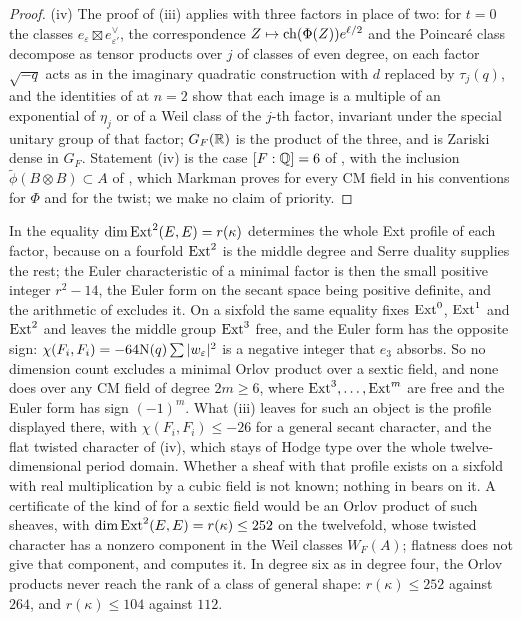 \begin{proof}
(iv) The proof of (iii) applies with three
factors in place of two: for $t=0$ the classes $e_{\varepsilon}\boxtimes
e_{\varepsilon'}^{\vee}$, the correspondence $Z\mapsto\operatorname{ch}(\Phi(Z))e^{\ell/2}$
and the Poincar\'e class decompose as tensor products over $j$ of classes of
even degree, on each factor $\sqrt{-q}$ acts as in the imaginary quadratic
construction with $d$ replaced by $\tau_{j}(q)$, and the identities of
 at $n=2$ show that each image is a multiple of an
exponential of $\eta_{j}$ or of a Weil class of the $j$-th factor, invariant
under the special unitary group of that factor; $G_{F}(\mathbb{R})$ is the product of
the three, and is Zariski dense in $G_{F}$. Statement (iv) is the case
$[F:\mathbb{Q}]=6$ of \cite[Proposition~10.2.1(1)]{Mar25c}, with the inclusion
$\widetilde\phi(B\otimes B)\subset A$ of \cite[p.~33]{Mar25c}, which Markman
proves for every CM field in his conventions for $\Phi$ and for the twist; we
make no claim of priority.
\end{proof}

\begin{remark}
\label{rem:sexticparity}
In  the equality $\dim\operatorname{Ext}^{2}(E,E)=r(\kappa)$
determines the whole Ext profile of each factor, because on a fourfold
$\operatorname{Ext}^{2}$ is the middle degree and Serre duality supplies the rest; the Euler
characteristic of a minimal factor is then the small positive integer
$r^{2}-14$, the Euler form on the secant space being positive definite, and
the arithmetic of  excludes it. On a sixfold the same
equality fixes $\operatorname{Ext}^{0}$, $\operatorname{Ext}^{1}$ and $\operatorname{Ext}^{2}$ and leaves the middle
group $\operatorname{Ext}^{3}$ free, and the Euler form has the opposite sign:
$\chi(F_{i},F_{i})=-64\mathrm{N}(q)\sum|w_{\varepsilon}|^{2}$ is a negative integer
that $e_{3}$ absorbs. So no dimension count excludes a minimal Orlov product
over a sextic field, and none does over any CM field of degree $2m\ge6$,
where $\operatorname{Ext}^{3},\dots,\operatorname{Ext}^{m}$ are free and the Euler form has sign
$(-1)^{m}$. What (iii) leaves for such an object is the
profile displayed there, with $\chi(F_{i},F_{i})\le-26$ for a general secant
character, and the flat twisted character of (iv), which stays of Hodge type
over the whole twelve-dimensional period domain. Whether a sheaf with that
profile exists on a sixfold with real multiplication by a cubic field is not
known; nothing in  bears on it. A certificate
of the kind of  for a sextic field would be an Orlov
product of such sheaves, with $\dim\operatorname{Ext}^{2}(E,E)=r(\kappa)\le252$ on the
twelvefold, whose twisted character has a nonzero component in the Weil
classes $W_{F}(A)$; flatness does not give that component, and
 computes it. In degree six as in degree four, the Orlov
products never reach the rank of a class of general shape: $r(\kappa)\le252$
against $264$, and $r(\kappa)\le104$ against $112$.
\end{remark}

